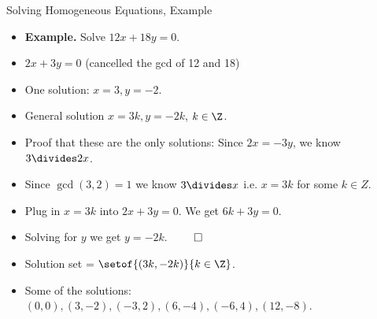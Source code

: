 \documentclass[handout]{beamer}
\begin{document}

\begin{frame}{Solving Homogeneous Equations, Example}

\begin{itemize}
  \item \textbf{Example.} Solve $12x + 18y = 0$.
  \item $2x + 3y = 0$  (cancelled the gcd of 12 and 18)
  \item One solution: $x=3, y=-2$.
  \item General solution $x=3k,y=-2k$, $k\in\Z$.
  \item Proof that these are the only solutions: Since $2x = -3y$, we know $3\divides 2x$.
  \item Since $\gcd(3,2)=1$ we know $3\divides x$ i.e. $x=3k$ for some $k\in Z$.
  \item Plug in $x=3k$ into $2x + 3y = 0$. We get $6k + 3y = 0$.
  \item Solving for $y$ we get $y=-2k$. $\qed$
  \item Solution set = $\setof{(3k, -2k)}{k\in\Z}$.
  \item Some of the solutions: $(0,0), (3,-2), (-3, 2), (6, -4), (-6, 4), (12, -8)$.
\end{itemize}

\end{frame}

\end{document}
